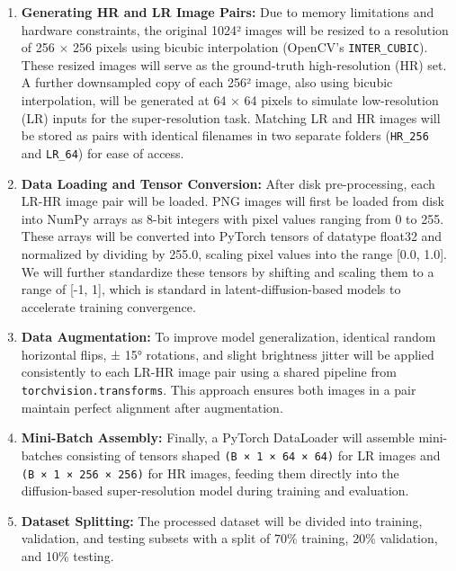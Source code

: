 \documentclass{article} %
\begin{document}
\begin{enumerate}
    \item \textbf{Generating HR and LR Image Pairs:} Due to memory limitations and hardware constraints, the original 1024² images will be resized to a resolution of 256 × 256 pixels using bicubic interpolation (OpenCV’s \texttt{INTER\_CUBIC}). These resized images will serve as the ground-truth high-resolution (HR) set. A further downsampled copy of each 256² image, also using bicubic interpolation, will be generated at 64 × 64 pixels to simulate low-resolution (LR) inputs for the super-resolution task. Matching LR and HR images will be stored as pairs with identical filenames in two separate folders (\texttt{HR\_256} and \texttt{LR\_64}) for ease of access.

    \item \textbf{Data Loading and Tensor Conversion:} After disk pre-processing, each LR-HR image pair will be loaded. PNG images will first be loaded from disk into NumPy arrays as 8-bit integers with pixel values ranging from 0 to 255. These arrays will be converted into PyTorch tensors of datatype float32 and normalized by dividing by 255.0, scaling pixel values into the range [0.0, 1.0]. We will further standardize these tensors by shifting and scaling them to a range of [-1, 1], which is standard in latent-diffusion-based models to accelerate training convergence.

    \item \textbf{Data Augmentation:} To improve model generalization, identical random horizontal flips, ± 15° rotations, and slight brightness jitter will be applied consistently to each LR-HR image pair using a shared pipeline from \texttt{torchvision.transforms}. This approach ensures both images in a pair maintain perfect alignment after augmentation.

    \item \textbf{Mini-Batch Assembly:} Finally, a PyTorch DataLoader will assemble mini-batches consisting of tensors shaped \texttt{(B × 1 × 64 × 64)} for LR images and \texttt{(B × 1 × 256 × 256)} for HR images, feeding them directly into the diffusion-based super-resolution model during training and evaluation.

    \item \textbf{Dataset Splitting:} The processed dataset will be divided into training, validation, and testing subsets with a split of 70\% training, 20\% validation, and 10\% testing.
\end{enumerate}
\end{document}
